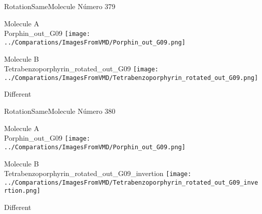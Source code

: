 \vtab[-2cm]
\begin{center}
{\large RotationSameMolecule \tab Número 379}
\end{center}
\begin{multicols}{2}
\begin{center}
Molecule A \\ 
Porphin\_out\_G09
\texttt{[image: ../Comparations/ImagesFromVMD/Porphin\_out\_G09.png]}
\\
\vtab

\columnbreak
Molecule B \\ 
Tetrabenzoporphyrin\_rotated\_out\_G09
\texttt{[image: ../Comparations/ImagesFromVMD/Tetrabenzoporphyrin\_rotated\_out\_G09.png]}
\\
\vtab


\end{center}
\end{multicols}
\begin{center}
\vtab
\vtab
\textcolor{NavyBlue}{\Large Different}
\end{center}

 \newpage

\vtab[-2cm]
\begin{center}
{\large RotationSameMolecule \tab Número 380}
\end{center}
\begin{multicols}{2}
\begin{center}
Molecule A \\ 
Porphin\_out\_G09
\texttt{[image: ../Comparations/ImagesFromVMD/Porphin\_out\_G09.png]}
\\
\vtab

\columnbreak
Molecule B \\ 
Tetrabenzoporphyrin\_rotated\_out\_G09\_invertion
\texttt{[image: ../Comparations/ImagesFromVMD/Tetrabenzoporphyrin\_rotated\_out\_G09\_invertion.png]}
\\
\vtab


\end{center}
\end{multicols}
\begin{center}
\vtab
\vtab
\textcolor{NavyBlue}{\Large Different}
\end{center}

 \newpage

